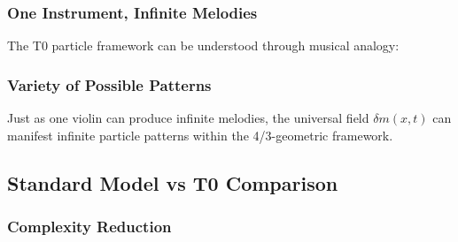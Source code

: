 	\subsubsection{One Instrument, Infinite Melodies}
	\label{subsubsec:one_instrument}
	
	The T0 particle framework can be understood through musical analogy:
	
	\begin{table}[htbp]
		\centering
		\caption{Musical analogy for T0 particle physics}
		\label{tab:musical_analogy}
	\end{table}
	
	\subsubsection{Variety of Possible Patterns}
	\label{subsubsec:infinite_potential}
	
	Just as one violin can produce infinite melodies, the universal field $\delta m(x,t)$ can manifest infinite particle patterns within the 4/3-geometric framework.
	
	\subsection{Standard Model vs T0 Comparison}
	\label{subsec:sm_vs_t0}
	
	\subsubsection{Complexity Reduction}
	\label{subsubsec:complexity_reduction}
	
